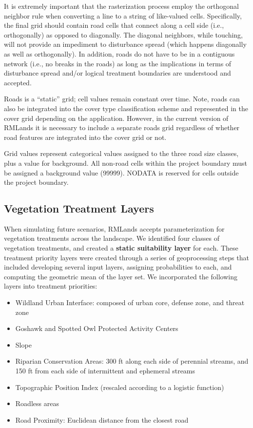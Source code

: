 It is extremely important that the rasterization process employ the orthogonal neighbor rule when converting a line to a string of like-valued cells. Specifically, the final grid should contain road cells that connect along a cell side (i.e., orthogonally) as opposed to diagonally. The diagonal neighbors, while touching, will not provide an impediment to disturbance spread (which happens diagonally as well as orthogonally). In addition, roads do not have to be in a contiguous network (i.e., no breaks in the roads) as long as the implications in terms of disturbance spread and/or logical treatment boundaries are understood and accepted. 

Roads is a “static” grid; cell values remain constant over time. Note, roads can also be integrated into the cover type classification scheme and represented in the cover grid depending on the application. However, in the current version of RMLands it is necessary to include a separate roads grid regardless of whether road features are integrated into the cover grid or not.

Grid values represent categorical values assigned to the three road size classes, plus a value for background. All non-road cells within the project boundary must be assigned a background value (99999). NODATA is reserved for cells outside the project boundary.

\subsection{Vegetation Treatment Layers}

When simulating future scenarios, RMLands accepts parameterization for vegetation treatments across the landscape. We identified four classes of vegetation treatments, and created a \textbf{static suitability layer} for each. These treatment priority layers were created through a series of geoprocessing steps that included developing several input layers, assigning probabilities to each, and computing the geometric mean of the layer set. We incorporated the following layers into treatment priorities:
\begin{itemize}
	\item Wildland Urban Interface: composed of urban core, defense zone, and threat zone
	\item Goshawk and Spotted Owl Protected Activity Centers
	\item Slope
	\item Riparian Conservation Areas: 300 ft along each side of perennial streams, and 150 ft from each side of intermittent and ephemeral streams
	\item Topographic Position Index (rescaled according to a logistic function)
	\item Roadless areas
	\item Road Proximity: Euclidean distance from the closest road
\end{itemize}


